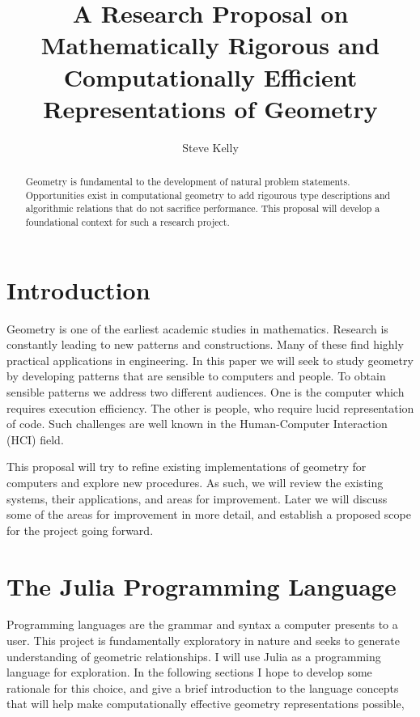 \documentclass[a4paper]{article}
\title{A Research Proposal on Mathematically Rigorous and Computationally
Efficient Representations of Geometry}
\author{Steve Kelly}
\begin{document}
\maketitle

\begin{abstract}
Geometry is fundamental to the development of natural problem statements.
Opportunities exist in computational geometry to
add rigourous type descriptions and algorithmic relations that do not
sacrifice performance. This proposal will develop a foundational context
for such a research project.
\end{abstract}

\section{Introduction}

Geometry is one of the earliest academic studies in mathematics. Research is
constantly leading to new patterns and constructions. Many of these find
highly practical applications in engineering. In this paper we will seek to
study geometry by developing patterns that are sensible to computers and people.
To obtain sensible patterns we address two different audiences.
One is the computer which requires execution efficiency. The other is people,
who require lucid representation of code. Such challenges are well known in
the Human-Computer Interaction (HCI) field\cite{Tognazzini_1993}.

This proposal will try to refine existing implementations of geometry for
computers and explore new procedures. As such, we will review the existing
systems, their applications, and areas for improvement. Later we will discuss
some of the areas for improvement in more detail, and establish a proposed
scope for the project going forward.

\section{The Julia Programming Language}

Programming languages are the grammar and syntax a computer presents to a user.
This project is fundamentally exploratory in nature and seeks to generate
understanding of geometric relationships. I will use Julia as a programming
language for exploration. In the following sections I hope to develop some
rationale for this choice, and give a brief introduction to the language
concepts that will help make computationally effective geometry representations
possible,
\end{document}

